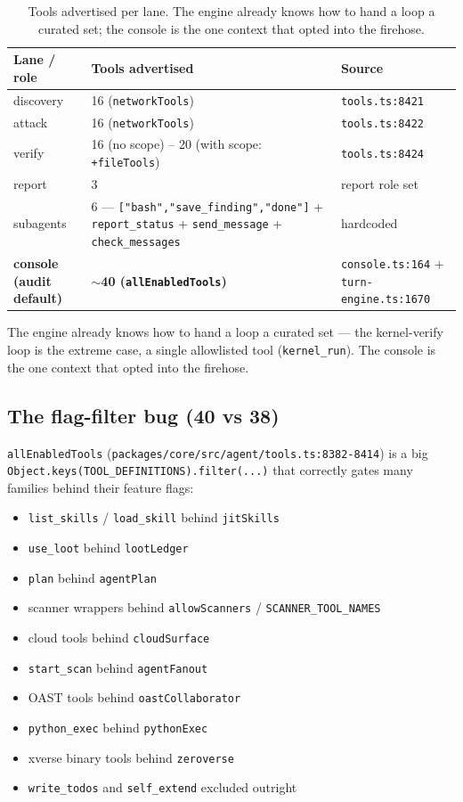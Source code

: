 \documentclass[11pt]{article}
\begin{document}
\begin{table}[ht]
\centering
\small
\begin{tabular}{lll}
\toprule
Lane / role & Tools advertised & Source \\
\midrule
discovery & 16 (\texttt{networkTools}) & \texttt{tools.ts:8421} \\
attack & 16 (\texttt{networkTools}) & \texttt{tools.ts:8422} \\
verify & 16 (no scope) -- 20 (with scope: \texttt{+fileTools}) & \texttt{tools.ts:8424} \\
report & 3 & report role set \\
subagents & 6 --- \texttt{["bash","save\_finding","done"]} + \texttt{report\_status} + \texttt{send\_message} + \texttt{check\_messages} & hardcoded \\
\textbf{console (audit default)} & \textbf{$\sim$40 (\texttt{allEnabledTools})} & \texttt{console.ts:164} + \texttt{turn-engine.ts:1670} \\
\bottomrule
\end{tabular}
\caption{Tools advertised per lane. The engine already knows how to hand a loop a curated set; the console is the one context that opted into the firehose.}
\label{tab:lanes}
\end{table}

The engine already knows how to hand a loop a curated set --- the kernel-verify
loop is the extreme case, a single allowlisted tool (\texttt{kernel\_run}). The
console is the one context that opted into the firehose.

\subsection{The flag-filter bug (40 vs 38)}

\texttt{allEnabledTools} (\texttt{packages/core/src/agent/tools.ts:8382-8414})
is a big \texttt{Object.keys(TOOL\_DEFINITIONS).filter(...)} that correctly gates
many families behind their feature flags:

\begin{itemize}[leftmargin=*]
  \item \texttt{list\_skills} / \texttt{load\_skill} behind \texttt{jitSkills}
  \item \texttt{use\_loot} behind \texttt{lootLedger}
  \item \texttt{plan} behind \texttt{agentPlan}
  \item scanner wrappers behind \texttt{allowScanners} / \texttt{SCANNER\_TOOL\_NAMES}
  \item cloud tools behind \texttt{cloudSurface}
  \item \texttt{start\_scan} behind \texttt{agentFanout}
  \item OAST tools behind \texttt{oastCollaborator}
  \item \texttt{python\_exec} behind \texttt{pythonExec}
  \item xverse binary tools behind \texttt{zeroverse}
  \item \texttt{write\_todos} and \texttt{self\_extend} excluded outright
\end{itemize}
\end{document}
